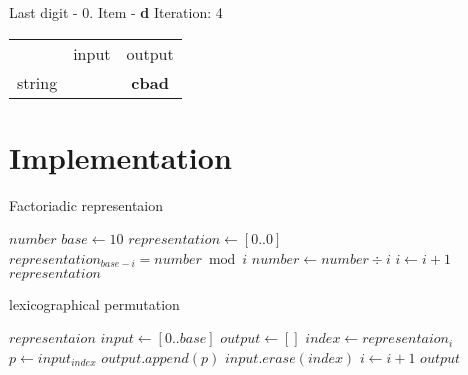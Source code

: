\documentclass{article}
\begin{document}
Last digit - 0. Item - \textbf{d} \newline
Iteration: 4 \qquad
\begin{tabular}{ l | c | c }
    \hline
    \quad       & input      & output       \\
    string      & \textbf{} & \textbf{cbad} \\
\end{tabular}
\newline\newline

\section{Implementation}

\begin{algorithm}
    \caption{Factoriadic representaion}\label{alg:factoriadic}
    \begin{algorithmic}[1]
        \Require $number$ 
        \State $base \gets 10$
        \State $representation \gets [0..0]$ 
            \State $representation_{base-i} = number \bmod i$
            \State $number \gets number \div i$
            \State $i \gets i + 1$
        \EndFor
        \State \Return $representation$
    \end{algorithmic}
\end{algorithm}

\begin{algorithm}
    \caption{lexicographical permutation}\label{alg:permutation}
    \begin{algorithmic}[1]
        \Require $representaion$ 
        \State $input \gets [0..base]$
        \State $output \gets []$ 
            \State $index \gets representaion_{i} $
            \State $p \gets input_{index}$
            \State $output.append(p)$
            \State $input.erase(index)$
            \State $i \gets i + 1$
        \EndFor
        \State \Return $output$
    \end{algorithmic}
\end{algorithm}
\end{document}
